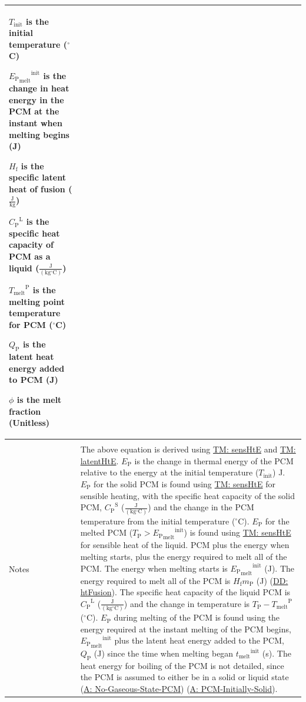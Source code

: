 \documentclass[12pt]{article}
\begin{document}
\begin{minipage}{\textwidth}
\begin{tabular}{>{\raggedright}p{}>{\raggedright\arraybackslash}p{}}
\begin{symbDescription}
              \item{${T_{\text{init}}}$ is the initial temperature (${}^{\circ}$C)}
              \item{${{{E_{\text{P}}}_{\text{melt}}}^{\text{init}}}$ is the change in heat energy in the PCM at the instant when melting begins (J)}
              \item{${H_{\text{f}}}$ is the specific latent heat of fusion ($\frac{\text{J}}{\text{kg}}$)}
              \item{${{C_{\text{P}}}^{\text{L}}}$ is the specific heat capacity of PCM as a liquid ($\frac{\text{J}}{(\text{kg}{}^{\circ}\text{C})}$)}
              \item{${{T_{\text{melt}}}^{\text{P}}}$ is the melting point temperature for PCM (${}^{\circ}$C)}
              \item{${Q_{\text{P}}}$ is the latent heat energy added to PCM (J)}
              \item{$ϕ$ is the melt fraction (Unitless)}
              \end{symbDescription}
\\ \midrule \\
Notes & The above equation is derived using \hyperref[TM:sensHtE]{TM: sensHtE} and \hyperref[TM:latentHtE]{TM: latentHtE}. ${E_{\text{P}}}$ is the change in thermal energy of the PCM relative to the energy at the initial temperature (${T_{\text{init}}}$) J. ${E_{\text{P}}}$ for the solid PCM is found using \hyperref[TM:sensHtE]{TM: sensHtE} for sensible heating, with the specific heat capacity of the solid PCM, ${{C_{\text{P}}}^{\text{S}}}$ ($\frac{\text{J}}{(\text{kg}{}^{\circ}\text{C})}$) and the change in the PCM temperature from the initial temperature (${}^{\circ}$C). ${E_{\text{P}}}$ for the melted PCM (${T_{\text{P}}}>{{{E_{\text{P}}}_{\text{melt}}}^{\text{init}}}$) is found using \hyperref[TM:sensHtE]{TM: sensHtE} for sensible heat of the liquid. PCM plus the energy when melting starts, plus the energy required to melt all of the PCM. The energy when melting starts is ${{{E_{\text{P}}}_{\text{melt}}}^{\text{init}}}$ (J). The energy required to melt all of the PCM is ${H_{\text{f}}} {m_{\text{P}}}$ (J) (\hyperref[DD:htFusion]{DD: htFusion}). The specific heat capacity of the liquid PCM is ${{C_{\text{P}}}^{\text{L}}}$ ($\frac{\text{J}}{(\text{kg}{}^{\circ}\text{C})}$) and the change in temperature is ${T_{\text{P}}}-{{T_{\text{melt}}}^{\text{P}}}$ (${}^{\circ}$C). ${E_{\text{P}}}$ during melting of the PCM is found using the energy required at the instant melting of the PCM begins, ${{{E_{\text{P}}}_{\text{melt}}}^{\text{init}}}$ plus the latent heat energy added to the PCM, ${Q_{\text{P}}}$ (J) since the time when melting began ${{t_{\text{melt}}}^{\text{init}}}$ (s). The heat energy for boiling of the PCM is not detailed, since the PCM is assumed to either be in a solid or liquid state (\hyperref[assumpNGSP]{A: No-Gaseous-State-PCM}) (\hyperref[assumpPIS]{A: PCM-Initially-Solid}).
        

\end{tabular}
\end{minipage}
\end{document}
